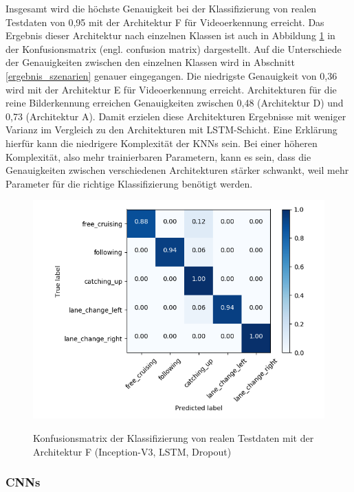 Insgesamt wird die höchste Genauigkeit bei der Klassifizierung von realen Testdaten von 0,95 mit der Architektur F für Videoerkennung erreicht. Das Ergebnis dieser Architektur nach einzelnen Klassen ist auch in Abbildung \ref{fig_cm_v3_lstm_d_real} in der Konfusionsmatrix (engl. confusion matrix) dargestellt. Auf die Unterschiede der Genauigkeiten zwischen den einzelnen Klassen wird in Abschnitt \ref{ergebnis_szenarien} genauer eingegangen. Die niedrigste Genauigkeit von 0,36 wird mit der Architektur E für Videoerkennung erreicht. Architekturen für die reine Bilderkennung erreichen Genauigkeiten zwischen 0,48 (Architektur D) und 0,73 (Architektur A). Damit erzielen diese Architekturen Ergebnisse mit weniger Varianz im Vergleich zu den Architekturen mit \ac{LSTM}-Schicht. Eine Erklärung hierfür kann die niedrigere Komplexität der \acp{KNN} sein. Bei einer höheren Komplexität, also mehr trainierbaren Parametern, kann es sein, dass die Genauigkeiten zwischen verschiedenen Architekturen stärker schwankt, weil mehr Parameter für die richtige Klassifizierung benötigt werden.

\begin{figure}[h]
\centering
{\includegraphics[scale=0.7]{images/cm_v3_lstm_d_real.png}}
\caption{Konfusionsmatrix der Klassifizierung von realen Testdaten mit der Architektur F (Inception-V3, \ac{LSTM}, Dropout)}
\label{fig_cm_v3_lstm_d_real}
\end{figure}

\subsubsection{\aclp{CNN}}

